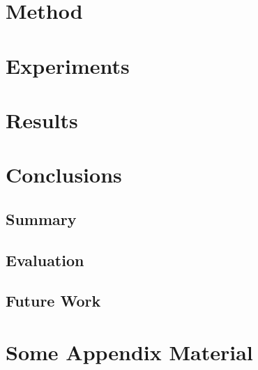 \documentclass[11pt, a4paper, bibliography=totoc]{report}
\begin{document}
\chapter{Method}

\chapter{Experiments}

\chapter{Results}

\chapter{Conclusions}
\section{Summary}
\section{Evaluation}
\section{Future Work}





\appendix
\appendixpage
\noappendicestocpagenum
\addappheadtotoc
\chapter{Some Appendix Material}
\end{document}
